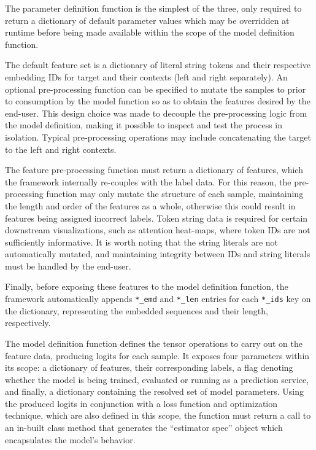 \documentclass[../../fyp.tex]{subfiles}
\begin{document}
The parameter definition function is the simplest of the three, only required to return a dictionary of default parameter values which may be overridden at runtime before being made available within the scope of the model definition function.

The default feature set is a dictionary of literal string tokens and their respective embedding IDs for target and their contexts (left and right separately). An optional pre-processing function can be specified to mutate the samples to prior to consumption by the model function so as to obtain the features desired by the end-user. This design choice was made to decouple the pre-processing logic from the model definition, making it possible to inspect and test the process in isolation. Typical pre-processing operations may include concatenating the target to the left and right contexts. 

The feature pre-processing function must return a dictionary of features, which the framework internally re-couples with the label data. For this reason, the pre-processing function may only mutate the structure of each sample, maintaining the length and order of the features as a whole, otherwise this could result in features being assigned incorrect labels. Token string data is required for certain downstream visualizations, such as attention heat-maps, where token IDs are not sufficiently informative. It is worth noting that the string literals are not automatically mutated, and maintaining integrity between IDs and string literals must be handled by the end-user. 

Finally, before exposing these features to the model definition function, the framework automatically appends \texttt{*\_emd} and \texttt{*\_len} entries for each \texttt{*\_ids} key on the dictionary, representing the embedded sequences and their length, respectively.

The model definition function defines the tensor operations to carry out on the feature data, producing logits for each sample. It exposes four parameters within its scope: a dictionary of features, their corresponding labels, a flag denoting whether the model is being trained, evaluated or running as a prediction service, and finally, a dictionary containing the resolved set of model parameters. Using the produced logits in conjunction with a loss function and optimization technique, which are also defined in this scope, the function must return a call to an in-built class method that generates the \enquote{estimator spec} object which encapsulates the model's behavior. 
\end{document}

